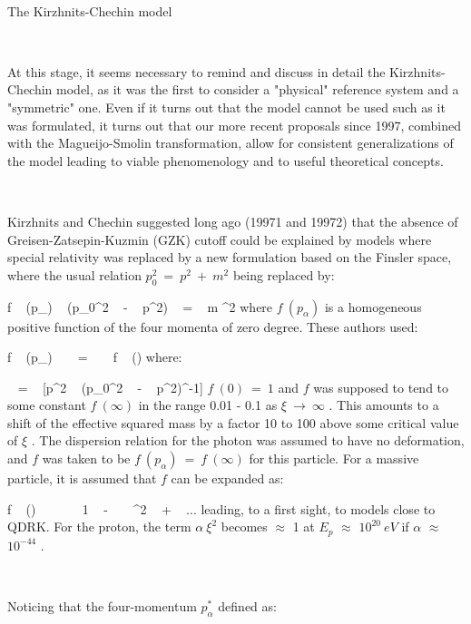 \documentclass[a4paper,12pt,dvips]{article}
\makeatletter
\renewcommand{\section}{\@startsection{section}{1}{0in}
	{0.4\baselineskip}{0.1\baselineskip}{\Large\bf}}
\makeatother
\begin{document}
~ 
~ 

\section{The Kirzhnits-Chechin model}
\label{kiche.sec}

~ 

At this stage, it seems necessary to remind and discuss in detail the Kirzhnits-Chechin model, as it was the first to consider a "physical" reference system and a "symmetric" one. Even if it turns out that the model cannot be used such as it was formulated, it turns out that our more recent proposals since 1997, combined with the Magueijo-Smolin transformation, allow for consistent generalizations of the model leading to viable phenomenology and to useful theoretical concepts.

~ 

Kirzhnits and Chechin suggested long ago (19971 and 19972) that the absence of Greisen-Zatsepin-Kuzmin (GZK) cutoff could be explained by models where special relativity was replaced by a new formulation based on the Finsler space, where the usual relation $ p_{0}^2 ~ = ~ p^2 ~ + ~ m ^2$ being replaced by:

\equation
f ~ (p_{\alpha}) ~ (p_{0}^2 ~ - ~ p^2) ~ = ~ m ^2
\endequation
\noindent
where $f ~ (p_{\alpha})$ is a homogeneous positive function of the four momenta of zero degree. These authors used:

\equation
f ~ (p_{\alpha}) ~ ~ = ~ ~ f ~ (\xi )
\endequation
\noindent
where:

\equation
\xi ~ = ~ [p^2 ~ (p_{0}^2 ~ - ~ p^2)^{-1}]
\endequation
\noindent
$f ~ (0) ~ = ~ 1$ and $f$ was supposed to tend to some constant $f ~ (\infty )$ in the range 0.01 - 0.1 as $\xi ~ \rightarrow ~ \infty $ . This amounts to a shift of the effective squared mass by a factor 10 to 100 above some critical value of $\xi $ . The dispersion relation for the photon was assumed to have no deformation, and $f$ was taken to be $f ~ (p_{\alpha}) ~ = ~ f ~ (\infty )$ for this particle. For a massive particle, it is assumed that $f$ can be expanded as: 

\equation
f ~ (\xi ) ~ ~ \simeq ~ ~ 1 ~ - ~ \alpha ~ \xi ^2 ~ + ~ ...
\endequation
\noindent
leading, to a first sight, to models close to QDRK. For the proton, the term $\alpha ~ \xi ^2 $ becomes $\approx $ 1 at $E_p$ $\approx $ $10^{20} ~ eV$ if $\alpha $ $\approx $ $10^{-44}$ .

~ 

Noticing that the four-momentum $p_{\alpha}^*$ defined as:
\end{document}
